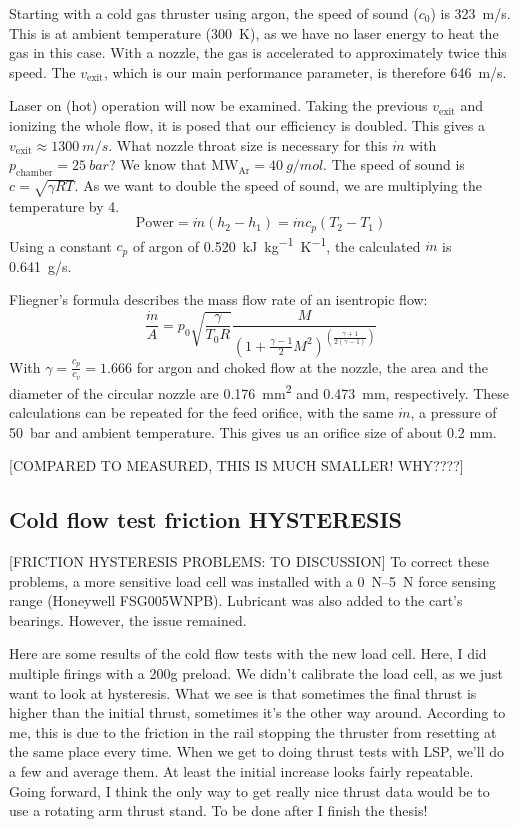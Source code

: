             Starting with a cold gas thruster using argon, the speed of sound ($c_0$) is \qty{323}{m/s}. This is at ambient temperature (\qty{300}{K}), as we have no laser energy to heat the gas in this case. With a nozzle, the gas is accelerated to approximately twice this speed. The $v_\mathrm{exit}$, which is our main performance parameter, is therefore \qty{646}{m/s}.
            
            Laser on (hot) operation will now be examined. Taking the previous $v_\mathrm{exit}$ and ionizing the whole flow, it is posed that our efficiency is doubled. This gives a $v_\mathrm{exit}\approx \qty{1300}{m/s}$. What nozzle throat size is necessary for this $\dot m$ with $p_\mathrm{chamber} = \qty{25}{bar}$? We know that $\mathrm{MW_{Ar}} = \qty{40}{g/mol}$. The speed of sound is $c = \sqrt{\gamma R T}$. As we want to double the speed of sound, we are multiplying the temperature by 4.
            \[\text{Power} = \dot m (h_2-h_1)
            = \dot m c_p (T_2-T_1)\]
            Using a constant $c_p$ of argon of \qty{0.520}{kJ.kg^{-1}.K^{-1}}, the calculated $\dot m$ is \qty{0.641}{g/s}.
            
            Fliegner's formula describes the mass flow rate of an isentropic flow:
            \[\frac{\dot m}{A} = p_0\sqrt{\frac{\gamma}{T_0 R}}\frac{M}{(1+\frac{\gamma-1}{2}M^2)^{(\frac{\gamma+1}{2(\gamma-1)})}}\]
            With $\gamma = \frac{c_p}{c_v} = 1.666$ for argon and choked flow at the nozzle, the area and the diameter of the circular nozzle are \qty{0.176}{mm^2} and \qty{0.473}{mm}, respectively. These calculations can be repeated for the feed orifice, with the same $\dot m$, a pressure of \qty{50}{bar} and ambient temperature. This gives us an orifice size of about 0.2 mm.

            [COMPARED TO MEASURED, THIS IS MUCH SMALLER! WHY????]
    
    \subsection{Cold flow test friction HYSTERESIS}

        [FRICTION HYSTERESIS PROBLEMS: TO DISCUSSION] To correct these problems, a more sensitive load cell was installed with a \qtyrange{0}{5}{N} force sensing range (Honeywell FSG005WNPB). Lubricant was also added to the cart's bearings. However, the issue remained.

        Here are some results of the cold flow tests with the new load cell. Here, I did multiple firings with a 200g preload. We didn't calibrate the load cell, as we just want to look at hysteresis. What we see is that sometimes the final thrust is higher than the initial thrust, sometimes it's the other way around. According to me, this is due to the friction in the rail stopping the thruster from resetting at the same place every time. When we get to doing thrust tests with LSP, we'll do a few and average them. At least the initial increase looks fairly repeatable.
        Going forward, I think the only way to get really nice thrust data would be to use a rotating arm thrust stand. To be done after I finish the thesis! 

